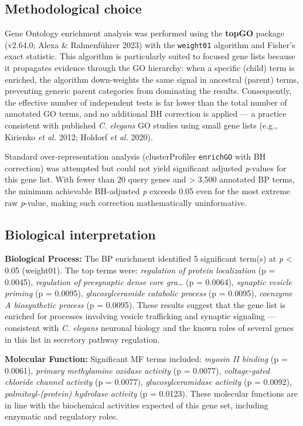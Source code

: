 \documentclass[
  11pt,
]{article}
\begin{document}
\subsection{Methodological choice}\label{methodological-choice}

Gene Ontology enrichment analysis was performed using the \textbf{topGO}
package (v2.64.0; Alexa \& Rahnenführer 2023) with the \texttt{weight01}
algorithm and Fisher's exact statistic. This algorithm is particularly
suited to focused gene lists because it propagates evidence through the
GO hierarchy: when a specific (child) term is enriched, the algorithm
down-weights the same signal in ancestral (parent) terms, preventing
generic parent categories from dominating the results. Consequently, the
effective number of independent tests is far lower than the total number
of annotated GO terms, and no additional BH correction is applied --- a
practice consistent with published \emph{C. elegans} GO studies using
small gene lists (e.g., Kirienko \emph{et al.} 2012; Holdorf \emph{et
al.} 2020).

Standard over-representation analysis (clusterProfiler \texttt{enrichGO}
with BH correction) was attempted but could not yield significant
adjusted \emph{p}-values for this gene list. With fewer than 20 query
genes and \textgreater{} 3,500 annotated BP terms, the minimum
achievable BH-adjusted \emph{p} exceeds 0.05 even for the most extreme
raw \emph{p}-value, making such correction mathematically uninformative.

\subsection{Biological interpretation}\label{biological-interpretation}

\textbf{Biological Process:} The BP enrichment identified 5 significant
term(s) at \emph{p} \textless{} 0.05 (weight01). The top terms were:
\emph{regulation of protein localization} (p = 0.0045), \emph{regulation
of presynaptic dense core gra\ldots{}} (p = 0.0064), \emph{synaptic
vesicle priming} (p = 0.0095), \emph{glucosylceramide catabolic process}
(p = 0.0095), \emph{coenzyme A biosynthetic process} (p = 0.0095). These
results suggest that the gene list is enriched for processes involving
vesicle trafficking and synaptic signaling --- consistent with \emph{C.
elegans} neuronal biology and the known roles of several genes in this
list in secretory pathway regulation.

\textbf{Molecular Function:} Significant MF terms included: \emph{myosin
II binding} (p = 0.0061), \emph{primary methylamine oxidase activity} (p
= 0.0077), \emph{voltage-gated chloride channel activity} (p = 0.0077),
\emph{glucosylceramidase activity} (p = 0.0092),
\emph{palmitoyl-(protein) hydrolase activity} (p = 0.0123). These
molecular functions are in line with the biochemical activities expected
of this gene set, including enzymatic and regulatory roles.
\end{document}
